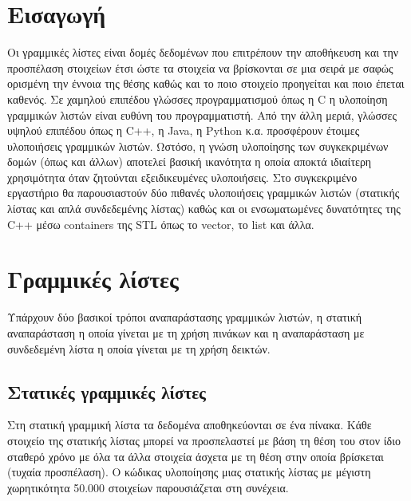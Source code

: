\section{Εισαγωγή}
Οι γραμμικές λίστες είναι δομές δεδομένων που επιτρέπουν την αποθήκευση και την προσπέλαση στοιχείων έτσι ώστε τα στοιχεία να βρίσκονται σε μια σειρά με σαφώς ορισμένη την έννοια της θέσης καθώς και το ποιο στοιχείο προηγείται και ποιο έπεται καθενός. Σε χαμηλού επιπέδου γλώσσες προγραμματισμού όπως η C η υλοποίηση γραμμικών λιστών είναι ευθύνη του προγραμματιστή. Από την άλλη μεριά, γλώσσες υψηλού επιπέδου όπως η C++, η Java, η Python κ.α. προσφέρουν έτοιμες υλοποιήσεις γραμμικών λιστών. Ωστόσο, η γνώση υλοποίησης των συγκεκριμένων δομών (όπως και άλλων) αποτελεί βασική ικανότητα η οποία αποκτά ιδιαίτερη χρησιμότητα όταν ζητούνται εξειδικευμένες υλοποιήσεις. Στο συγκεκριμένο εργαστήριο θα παρουσιαστούν δύο πιθανές υλοποιήσεις γραμμικών λιστών (στατικής λίστας και απλά συνδεδεμένης λίστας) καθώς και οι ενσωματωμένες δυνατότητες της C++ μέσω containers της STL όπως το vector, το list και άλλα.

\section{Γραμμικές λίστες}
Υπάρχουν δύο βασικοί τρόποι αναπαράστασης γραμμικών λιστών, η στατική αναπαράσταση η οποία γίνεται με τη χρήση πινάκων και η αναπαράσταση με συνδεδεμένη λίστα η οποία γίνεται με τη χρήση δεικτών. 

\subsection{Στατικές γραμμικές λίστες}
Στη στατική γραμμική λίστα τα δεδομένα αποθηκεύονται σε ένα πίνακα. Κάθε στοιχείο της στατικής λίστας μπορεί να προσπελαστεί με βάση τη θέση του στον ίδιο σταθερό χρόνο με όλα τα άλλα στοιχεία άσχετα με τη θέση στην οποία βρίσκεται (τυχαία προσπέλαση). Ο κώδικας υλοποίησης μιας στατικής λίστας με μέγιστη χωρητικότητα 50.000 στοιχείων παρουσιάζεται στη συνέχεια.







